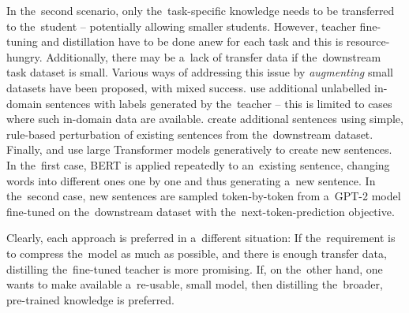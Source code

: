 \documentclass[bsc,frontabs,singlespacing,parskip,deptreport]{infthesis}
\begin{document}
{{{      %

      In the~second scenario, only the~task-specific knowledge needs to be transferred to the~student -- potentially allowing smaller students.
      However, teacher fine-tuning and distillation have to be done anew for each task and this is resource-hungry.
      Additionally, there may be a~lack of transfer data if the~downstream task dataset is small.
      Various ways of addressing this issue by \textit{augmenting} small datasets have been proposed, with mixed success. 
      \citet{Mukherjee_2019} use additional unlabelled in-domain sentences with labels generated by the~teacher -- this is limited to cases where such in-domain data are available. \citet{Tang_2019a} create additional sentences using simple, rule-based perturbation of existing sentences from the~downstream dataset. Finally, \citet{Jiao_2019} and \citet{Tang_2019b} use large Transformer models generatively to create new sentences. In the~first case, BERT is applied repeatedly to an~existing sentence, changing words into different ones one by one and thus generating a~new sentence. In the~second case, new sentences are sampled token-by-token from a~GPT-2 model fine-tuned on the~downstream dataset with the~next-token-prediction objective.

      Clearly, each approach is preferred in a~different situation: If the~requirement is to compress the~model as much as possible, and there is enough transfer data, distilling the~fine-tuned teacher is more promising. If, on the~other hand, one wants to make available a~re-usable, small model, then distilling the~broader, pre-trained knowledge is preferred.
    }
  }
  
}
\end{document}
